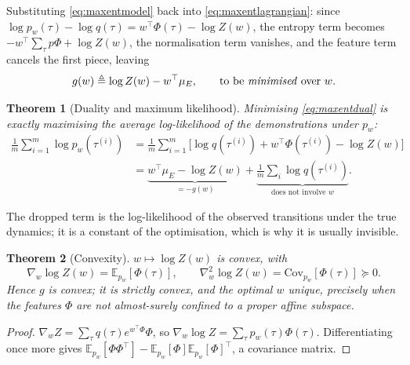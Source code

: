 \documentclass[11pt]{article}
\theoremstyle{plain}
\newtheorem{theorem}{Theorem}[section]
\theoremstyle{definition}
\theoremstyle{remark}
\newcommand{\E}{\mathbb{E}}
\begin{document}
Substituting \eqref{eq:maxentmodel} back into \eqref{eq:maxentlagrangian}:
since $\log p_w(\tau) - \log q(\tau) = w^\top\Phi(\tau) - \log Z(w)$, the
entropy term becomes $-w^\top\sum_\tau p\Phi + \log Z(w)$, the
normalisation term vanishes, and the feature term cancels the first
piece, leaving
\begin{equation}
g(w) \triangleq \log Z(w) - w^\top \mu_E, \qquad \text{to be
\emph{minimised} over } w.
\label{eq:maxentdual}
\end{equation}

\begin{theorem}[Duality and maximum likelihood]\label{thm:maxentduality}
Minimising \eqref{eq:maxentdual} is exactly maximising the average
log-likelihood of the demonstrations under $p_w$:
\begin{equation}
\begin{aligned}
\frac1m\sum_{i=1}^m \log p_w(\tau^{(i)})
&= \frac1m\sum_{i=1}^m \Big[\log q(\tau^{(i)}) + w^\top\Phi(\tau^{(i)}) - \log Z(w)\Big]\\
&= \underbrace{w^\top\mu_E - \log Z(w)}_{=-g(w)}
+ \underbrace{\tfrac1m\sum_i \log q(\tau^{(i)})}_{\text{does not involve } w}.
\end{aligned}
\label{eq:maxentmle}
\end{equation}
\end{theorem}

The dropped term is the log-likelihood of the observed transitions under
the true dynamics; it is a constant of the optimisation, which is why it
is usually invisible.

\begin{theorem}[Convexity]\label{thm:logzconvex}
$w\mapsto \log Z(w)$ is convex, with
\begin{equation}
\nabla_w \log Z(w) = \E_{p_w}[\Phi(\tau)], \qquad
\nabla_w^2 \log Z(w) = \mathrm{Cov}_{p_w}[\Phi(\tau)] \succeq 0.
\label{eq:logzgrad}
\end{equation}
Hence $g$ is convex; it is strictly convex, and the optimal $w$ unique,
precisely when the features $\Phi$ are not almost-surely confined to a
proper affine subspace.
\end{theorem}

\begin{proof}
$\nabla_w Z = \sum_\tau q(\tau)e^{w^\top\Phi}\Phi$, so $\nabla_w \log Z =
\sum_\tau p_w(\tau)\Phi(\tau)$. Differentiating once more gives
$\E_{p_w}[\Phi\Phi^\top] - \E_{p_w}[\Phi]\E_{p_w}[\Phi]^\top$, a covariance
matrix.
\end{proof}
\end{document}
